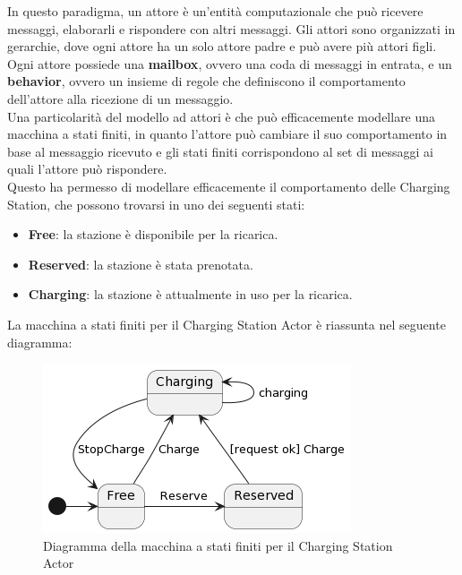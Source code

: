 In questo paradigma, un attore è un'entità computazionale che può ricevere messaggi, elaborarli e rispondere con altri messaggi. Gli attori sono organizzati in gerarchie, dove ogni attore ha un solo attore padre e può avere più attori figli.\\
Ogni attore possiede una \textbf{mailbox}, ovvero una coda di messaggi in entrata, e un \textbf{behavior}, ovvero un insieme di regole che definiscono il comportamento dell'attore alla ricezione di un messaggio.\\

Una particolarità del modello ad attori è che può efficacemente modellare una macchina a stati finiti, in quanto l'attore può cambiare il suo comportamento in base al messaggio ricevuto e gli stati finiti corrispondono al set di messaggi ai quali l'attore può rispondere.\\
Questo ha permesso di modellare efficacemente il comportamento delle Charging Station, che possono trovarsi in uno dei seguenti stati:
\begin{itemize}
    \item \textbf{Free}: la stazione è disponibile per la ricarica.
    \item \textbf{Reserved}: la stazione è stata prenotata.
    \item \textbf{Charging}: la stazione è attualmente in uso per la ricarica.
\end{itemize}

La macchina a stati finiti per il Charging Station Actor è riassunta nel seguente diagramma:

\begin{figure}[htbp]
    \centering
    \includegraphics[width=\textwidth]{images/cs-state.png}
    \caption{Diagramma della macchina a stati finiti per il Charging Station Actor}
    \label{fig:cs-state}
\end{figure}


